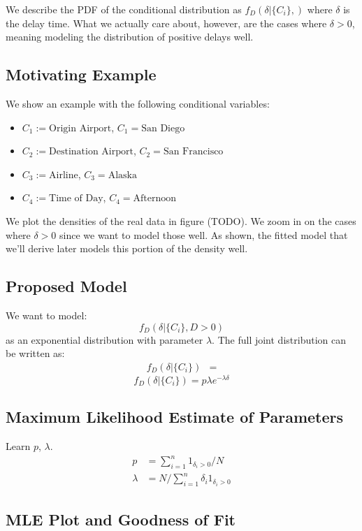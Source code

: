 \documentclass{article}
\begin{document}
We describe the PDF of the conditional distribution as $f_D(\delta|\{C_i\}, )$ where $\delta$ is the delay time. What we actually care about, however, are
the cases where $\delta > 0$, meaning modeling the distribution of positive delays well.

\subsection{Motivating Example}
We show an example with the following conditional variables:
\begin{itemize}
  \item $C_1 := \text{Origin Airport}$, $C_1 = \text{San Diego}$
  \item $C_2 := \text{Destination Airport}$, $C_2 = \text{San Francisco}$
  \item $C_3 := \text{Airline}$, $C_3 = \text{Alaska}$
  \item $C_4 := \text{Time of Day}$, $C_4 = \text{Afternoon}$
\end{itemize}
We plot the densities of the real data in figure (TODO). We zoom in on the cases where $\delta > 0$ since we want to model those well.
As shown, the fitted model that we'll derive later models this portion of the density well.

\subsection{Proposed Model}
We want to model:
$$f_D(\delta | \{C_i\}, D > 0)$$
as an exponential distribution with parameter $\lambda$. The full joint distribution can be written as:
\begin{align*}
  f_D(\delta | \{C_i\}) &= 
\end{align*}
$$f_D(\delta|\{C_i\}) = p\lambda e^{-\lambda \delta}$$

\subsection{Maximum Likelihood Estimate of Parameters}
Learn $p$, $\lambda$.
\begin{align*}
    p &= \sum_{i=1}^n 1_{\delta_i > 0} / N \\
    \lambda &= N / \sum_{i=1}^n \delta_i 1_{\delta_i > 0}
\end{align*}

\subsection{MLE Plot and Goodness of Fit}
\end{document}
